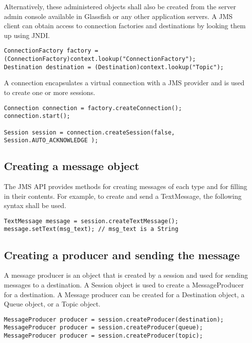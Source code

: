 \documentclass[9pt,twocolumn,twoside]{styles/osajnl}
\begin{document}
Alternatively, these administered objects shall also be created from
the server admin console available in Glassfish or any other
application servers.  A JMS client can obtain access to connection
factories and destinations by looking them up using JNDI.

\begin{lstlisting}
ConnectionFactory factory =
(ConnectionFactory)context.lookup("ConnectionFactory"); 
Destination destination = (Destination)context.lookup("Topic");
\end{lstlisting}

A connection encapsulates a virtual connection with a JMS provider
and is used to create one or more sessions.

\begin{lstlisting}
Connection connection = factory.createConnection();
connection.start();

Session session = connection.createSession(false,
Session.AUTO_ACKNOWLEDGE );
\end{lstlisting}

\subsection{Creating a message object}

The JMS API provides methods for creating messages of each type and
for filling in their contents. For example, to create and send a
TextMessage, the following syntax shall be used.

\begin{lstlisting}
TextMessage message = session.createTextMessage();
message.setText(msg_text); // msg_text is a String
\end{lstlisting}

\subsection{Creating a producer and sending the message}

A message producer is an object that is created by a session and used
for sending messages to a destination.  A Session object is used to
create a MessageProducer for a destination. A Message producer can be
created for a Destination object, a Queue object, or a Topic object.

\begin{lstlisting}
MessageProducer producer = session.createProducer(destination);
MessageProducer producer = session.createProducer(queue);
MessageProducer producer = session.createProducer(topic);
\end{lstlisting}
\end{document}
